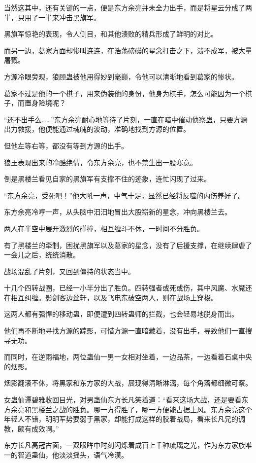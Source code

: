 \begin{this_body}
当然这其中，还有关键的一点，便是东方余亮并未全力出手，而是将星云分成了两半，只用了一半来冲击黑旗军。

黑旗军惊艳的表现，令人侧目，和其他溃败的精兵形成了鲜明的对比。

而另一边，葛家方面却惨叫连连，在浩荡磅礴的星念打击之下，溃不成军，被大量屠戮。

方源冷眼旁观，狼顾蛊被他用得妙到毫巅，令他可以清晰地看到葛家的惨状。

葛家不过是他的一个棋子，用来伪装他的身份，他身为棋手，怎么可能因为一个棋子，而置身险境呢？

“还不出手么……”东方余亮耐心地等待了片刻，一直在暗中催动侦察蛊，只要方源出力救援，他便能通过魂魄的波动，准确地找到方源的位置。

但他左等右等，都没有等到方源的出手。

狼王表现出来的冷酷绝情，令东方余亮，也不禁生出一股寒意。

倒是黑楼兰看见自家的黑旗军有支撑不住的迹象，连忙闪现了过来。

“东方余亮，受死吧！”他大吼一声，中气十足，显然已经将反噬的内伤养好了。

东方余亮冷哼一声，从头脑中汩汩地冒出大股崭新的星念，冲向黑楼兰去。

两人在半空中展开激烈的碰撞，相互缠斗不休，一时间不分胜负。

有了黑楼兰的牵制，困扰黑旗军以及葛家的星念，没有了后援支撑，在继续肆虐了一会儿之后，统统消散。

战场混乱了片刻，又回到僵持的状态当中。

十几个四转战圈，已经一小半分出了胜负。四转强者或死或伤，其中风魔、水魔还在相互纠缠。影剑客边丝轩，以及飞电东破空两人，则在战场上穿梭。

这两人都有强悍的移动蛊，即便遭到四转蛊师的拦截，也会轻易地脱身而出。

他们再不断地寻找方源的踪影，可惜方源一直暗藏着，没有出手，导致他们一直搜寻无功。

而同时，在逆雨福地，两位蛊仙一男一女相对坐着，一边品茶，一边看着石桌中央的烟影。

烟影翻滚不休，将黑家和东方家的大战，展现得清晰淋漓，每个角落都细微可察。

女蛊仙谭碧雅收回目光，对男蛊仙东方长凡笑着道：“看来这场大战，还是要看东方余亮和黑楼兰之战的胜负。哪一方得胜了，哪一方便能占据上风。东方余亮这个年轻人不错，明明军势要弱于黑家，却能打成这样的胶着战局，看来长凡兄的调教，颇有成效啊。”

东方长凡高冠古面，一双眼眸中时刻闪烁着成百上千种琉璃之光，作为东方家族唯一的智道蛊仙，他淡淡摇头，语气冷漠。


\end{this_body}

